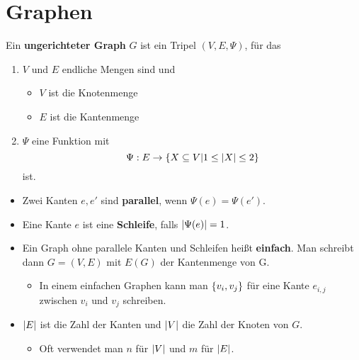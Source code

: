 \section{Graphen}
	\begin{definition}
		Ein \textbf{ungerichteter Graph} $G$ ist ein Tripel $(V, E, \Psi)$, für das
		\begin{enumerate}
			\item $V$ und $E$ endliche Mengen sind und
			\begin{itemize}
				\item $V$ ist die Knotenmenge
				\item $E$ ist die Kantenmenge
			\end{itemize}
			\item $\Psi$ eine Funktion mit
			\begin{equation*}
				\Psi : E \to \{X \subseteq V \vert 1 \le \vert X \vert \le 2\}
			\end{equation*}
			ist.\\
		\end{enumerate}
		\begin{itemize}
				\item Zwei Kanten $e, e'$ sind \textbf{parallel}, wenn $\Psi(e) = \Psi(e')$.
				\item Eine Kante $e$ ist eine \textbf{Schleife}, falls $\vert \Psi(e) \vert = 1$.
				\item Ein Graph ohne parallele Kanten und Schleifen heißt \textbf{einfach}. Man schreibt dann $G = (V, E)$ mit $E(G)$ der Kantenmenge von G.
				\begin{itemize}[label=$\hookrightarrow$]
					\item  In einem einfachen Graphen kann man $\{v_i, v_j\}$ für eine Kante $e_{i,j}$ zwischen $v_i$ und $v_j$ schreiben.
				\end{itemize}
				\item $\vert E \vert$ ist die Zahl der Kanten und $\vert V \vert$ die Zahl der Knoten von $G$.
				\begin{itemize}[label=$\hookrightarrow$]
					\item Oft verwendet man $n$ für $\vert V \vert$ und $m$ für $\vert E \vert$.
				\end{itemize}
			\end{itemize}
	\end{definition}
